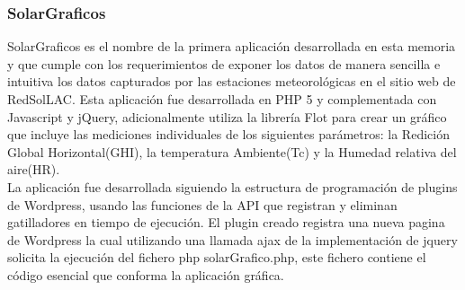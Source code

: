 \subsubsection{SolarGraficos}
SolarGraficos es el nombre de la primera aplicación desarrollada en esta memoria y que cumple con los requerimientos de exponer los datos de manera sencilla e intuitiva los datos capturados por las estaciones meteorológicas en el sitio web de RedSolLAC. Esta aplicación fue desarrollada en PHP 5 y complementada con Javascript y jQuery, adicionalmente utiliza la librería Flot para crear un gráfico que incluye las mediciones individuales de los siguientes parámetros: la Redición Global Horizontal(GHI), la temperatura Ambiente(Tc) y la Humedad relativa del aire(HR).\\

La aplicación fue desarrollada siguiendo la estructura de programación de plugins de Wordpress\cite{aplicaciones:wplugins}, usando las funciones de la API que registran y eliminan gatilladores en tiempo de ejecución. El plugin creado registra una nueva pagina de Wordpress la cual utilizando una llamada ajax de la implementación de jquery solicita la ejecución del fichero php solarGrafico.php, este fichero contiene el código esencial que conforma la aplicación gráfica.

